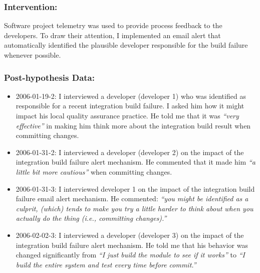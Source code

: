 \subsubsection{Intervention:}

Software project telemetry was used to provide process feedback to the developers. To draw their attention, I implemented an email alert that automatically identified the plausible developer responsible for the build failure whenever possible.

\subsubsection{Post-hypothesis Data:}
\begin{itemize}
  \setlength{\itemsep}{0pt}
  \setlength{\parskip}{0pt}
  
  \item 2006-01-19-2: I interviewed a developer (developer 1) who was identified as responsible for a recent integration build failure. I asked him how it might impact his local quality assurance practice. He told me that it was \textit{``very effective''} in making him think more about the integration build result when committing changes.%
  
  \item 2006-01-31-2: I interviewed a developer (developer 2) on the impact of the integration build failure alert mechanism. He commented that it made him \textit{``a little bit more cautious''} when committing changes. %
  
  \item 2006-01-31-3: I interviewed developer 1 on the impact of the integration build failure email alert mechanism. He commented: \textit{``you might be identified as a culprit, (which) tends to make you try a little harder to think about when you actually do the thing (i.e., committing changes).''} %
  
  \item 2006-02-02-3: I interviewed a developer (developer 3) on the impact of the integration build failure alert mechanism. He told me that his behavior was changed significantly from \textit{``I just build the module to see if it works''} to \textit{``I build the entire system and test every time before commit.''} %
  

\end{itemize}
